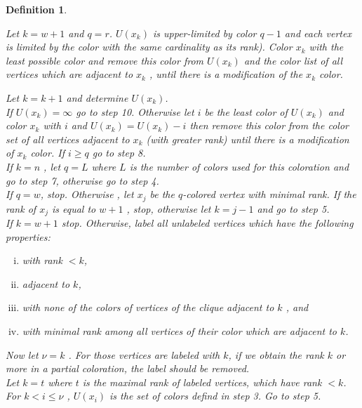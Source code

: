 \documentclass[12pt]{article}
\theoremstyle{slplain}
\newtheorem{defi}{Definition}
\begin{document}
\begin{defi}
\begin{enumerate}
\begin{algorithm}[H]
{ Let $k = w + 1$ and $q = r$.\newline
$U(x_k)$ is upper-limited by color $q - 1$ and each vertex is limited by the color
with the same cardinality as its rank). Color $x_k$ with the least possible
color and remove this color from $U(x_k)$ and the color list of all vertices
which are adjacent to $x_k$ , until there is a modification of the $x_k$ color.

 Let $k = k + 1$ and determine $U(x_k)$.\\

 If $U(x_k) = \infty$ go to step 10. Otherwise let $i$ be the least color of $U(x_k)$ and
color $x_k$ with $i$ and $U(x_k) = U(x_k) - i$ then remove this color from the
color set of all vertices adjacent to $x_k$ (with greater rank) until there is a
modification of $x_k$ color. If $i \geq q$ go to step 8.\\

 If $k = n$ , let $q = L$ where $L$ is the number of colors used for this coloration
and go to step 7, otherwise go to step 4.\\

 If $q = w$, stop. Otherwise , let $x_j$ be the $q$-colored vertex with minimal
rank. If the rank of $x_j$ is equal to $w + 1$ , stop, otherwise let $k = j - 1$ and
go to step 5.\\

 If $k = w + 1$ stop. Otherwise, label all unlabeled vertices which have the
following properties:
\begin{enumerate}[(i)]
\item with rank $< k$,

\item adjacent to $k$,

\item with none of the colors of vertices of the clique adjacent to $k$ , and
\item with minimal rank among all vertices of their color which are adjacent
to $k$.
\end{enumerate}\newline
Now let $\nu = k$ . For those vertices are labeled with $k$, if we obtain the rank
$k$ or more in a partial coloration, the label should be removed.\\


\nl Let $k = t$ where $t$ is the maximal rank of labeled vertices, which have rank $< k$. For $k < i \leq \nu$ , $U(x_i)$ is the set of colors defind in step 3. Go to step 5.\\


}
\end{algorithm}
\end{enumerate}
\end{defi}
\end{document}
